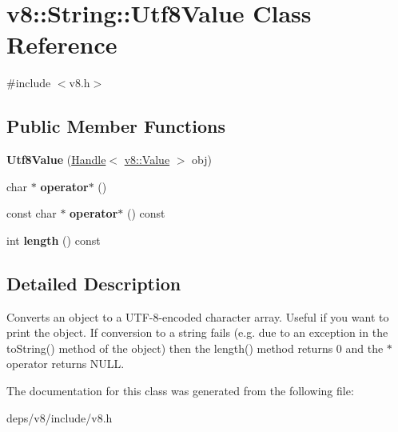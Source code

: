 \hypertarget{classv8_1_1_string_1_1_utf8_value}{}\section{v8\+:\+:String\+:\+:Utf8\+Value Class Reference}
\label{classv8_1_1_string_1_1_utf8_value}


{\ttfamily \#include $<$v8.\+h$>$}

\subsection*{Public Member Functions}
\begin{DoxyCompactItemize}
\item 
\hypertarget{classv8_1_1_string_1_1_utf8_value_aded9fd7ed406e79d5bc40eca15b6b3d7}{}{\bfseries Utf8\+Value} (\hyperlink{classv8_1_1_local}{Handle}$<$ \hyperlink{classv8_1_1_value}{v8\+::\+Value} $>$ obj)\label{classv8_1_1_string_1_1_utf8_value_aded9fd7ed406e79d5bc40eca15b6b3d7}

\item 
\hypertarget{classv8_1_1_string_1_1_utf8_value_a6cb4914bc426bbe60b0dfdff32213e59}{}char $\ast$ {\bfseries operator$\ast$} ()\label{classv8_1_1_string_1_1_utf8_value_a6cb4914bc426bbe60b0dfdff32213e59}

\item 
\hypertarget{classv8_1_1_string_1_1_utf8_value_a6557ad0916c472faebd8bfdc3da5c4f7}{}const char $\ast$ {\bfseries operator$\ast$} () const \label{classv8_1_1_string_1_1_utf8_value_a6557ad0916c472faebd8bfdc3da5c4f7}

\item 
\hypertarget{classv8_1_1_string_1_1_utf8_value_a1e2572abf6adc0786769482df9906f19}{}int {\bfseries length} () const \label{classv8_1_1_string_1_1_utf8_value_a1e2572abf6adc0786769482df9906f19}

\end{DoxyCompactItemize}


\subsection{Detailed Description}
Converts an object to a U\+T\+F-\/8-\/encoded character array. Useful if you want to print the object. If conversion to a string fails (e.\+g. due to an exception in the to\+String() method of the object) then the length() method returns 0 and the $\ast$ operator returns N\+U\+L\+L. 

The documentation for this class was generated from the following file\+:\begin{DoxyCompactItemize}
\item 
deps/v8/include/v8.\+h\end{DoxyCompactItemize}
